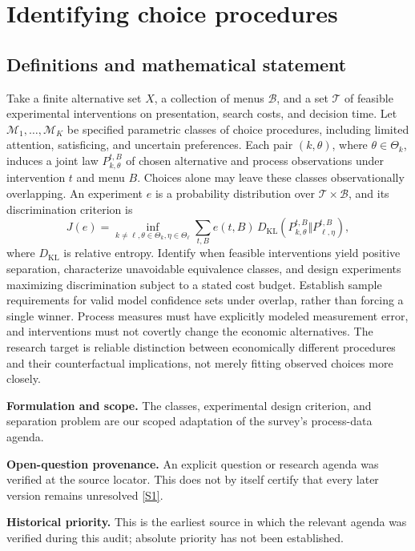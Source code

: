 \documentclass[11pt]{article}
\newcommand{\sref}[2]{\hyperlink{source:#1:#2}{[S#2]}}
\begin{document}
\section*{Identifying choice procedures}\label{30007555}
\subsection{Definitions and mathematical statement}
Take a finite alternative set \(X\), a collection of menus \(\mathcal B\), and a set \(\mathcal T\) of feasible experimental interventions on presentation, search costs, and decision time. Let \(\mathcal M_1,\ldots,\mathcal M_K\) be specified parametric classes of choice procedures, including limited attention, satisficing, and uncertain preferences. Each pair \((k,\theta)\), where \(\theta\in\Theta_k\), induces a joint law \(P_{k,\theta}^{t,B}\) of chosen alternative and process observations under intervention \(t\) and menu \(B\). Choices alone may leave these classes observationally overlapping. An experiment \(e\) is a probability distribution over \(\mathcal T\times\mathcal B\), and its discrimination criterion is
\[
 J(e)=\inf_{k\ne\ell,\theta\in\Theta_k,\eta\in\Theta_\ell}
 \sum_{t,B}e(t,B)\,D_{\mathrm{KL}}(P_{k,\theta}^{t,B}\Vert P_{\ell,\eta}^{t,B}),
\]
where \(D_{\mathrm{KL}}\) is relative entropy. Identify when feasible interventions yield positive separation, characterize unavoidable equivalence classes, and design experiments maximizing discrimination subject to a stated cost budget. Establish sample requirements for valid model confidence sets under overlap, rather than forcing a single winner. Process measures must have explicitly modeled measurement error, and interventions must not covertly change the economic alternatives. The research target is reliable distinction between economically different procedures and their counterfactual implications, not merely fitting observed choices more closely.

\par\textbf{Formulation and scope.} The classes, experimental design criterion, and separation problem are our scoped adaptation of the survey’s process-data agenda.

\par\textbf{Open-question provenance.} An explicit question or research agenda was verified at the source locator. This does not by itself certify that every later version remains unresolved \sref{30007555}{1}.

\par\textbf{Historical priority.} This is the earliest source in which the relevant agenda was verified during this audit; absolute priority has not been established.
\end{document}
